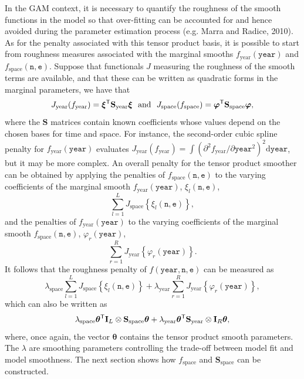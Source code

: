 \documentclass[12pt]{article}
\newcommand{\beq}{\begin{equation}}
\newcommand{\eeq}{\end{equation}}
\newcommand{\ts}{^{\sf T}}
\theoremstyle{definition}
\theoremstyle{plain}
\begin{document}
In the GAM context, it is necessary to quantify the roughness of the smooth functions in the model so that over-fitting can be accounted for and hence avoided during the parameter estimation process (e.g. Marra and Radice, 2010). As for the penalty associated with this tensor product basis, it is possible to start from roughness measures associated with the marginal smooths $f_\text{year}(\texttt{year})$ and $f_\text{space}(\texttt{n},\texttt{e})$. Suppose that functionals $J$ measuring the roughness of the smooth terms are available, and that these can be written as quadratic forms in the marginal parameters, we have that
$$
J_\text{year}(f_\text{year})=\bm\xi\ts\textbf{S}_\text{year}\bm\xi \ \ \text{and} \ \ J_\text{space}(f_\text{space})=\bm\varphi\ts\textbf{S}_\text{space}\bm\varphi,
$$
where the $\textbf{S}$ matrices contain known coefficients whose values depend on the chosen bases for time and space. For instance, the second-order cubic spline penalty for $f_\text{year}(\texttt{year})$ evaluates $J_\text{year}(f_\text{year})=\int\left( \partial^2 f_\text{year}/\partial \texttt{year}^2 \right)^2 \text{d}\texttt{year}$, but it may be more complex. An overall penalty for the tensor product smoother can be obtained by applying the penalties of $f_\text{space}(\texttt{n},\texttt{e})$ to the varying coefficients of the marginal smooth $f_\text{year}(\texttt{year})$, $\xi_l(\texttt{n},\texttt{e})$,
$$
\sum_{l=1}^L J_\text{space}\left\{  \xi_l(\texttt{n},\texttt{e}) \right\},
$$ 
and the penalties of $f_\text{year}(\texttt{year})$ to the varying coefficients of the marginal smooth $f_\text{space}(\texttt{n},\texttt{e})$, $\varphi_r(\texttt{year})$,  
$$
\sum_{r=1}^R J_\text{year}\left\{  \varphi_r(\texttt{year}) \right\}.
$$ 
It follows that the roughness penalty of $f(\texttt{year},\texttt{n},\texttt{e})$ can be measured as 
$$
\lambda_\text{space} \sum_{l=1}^L J_\text{space}\left\{  \xi_l(\texttt{n},\texttt{e}) \right\} + \lambda_\text{year} \sum_{r=1}^R J_\text{year}\left\{  \varphi_r(\texttt{year}) \right\},
$$
which can also be written as
\beq
\lambda_\text{space} \bm\theta\ts \textbf{I}_L \otimes \textbf{S}_\text{space} \bm\theta + \lambda_\text{year} \bm\theta\ts \textbf{S}_\text{year} \otimes \textbf{I}_R  \bm\theta,
\label{TensProd}
\eeq
where, once again, the vector $\bm\theta$ contains the tensor product smooth parameters. The $\lambda$ are smoothing parameters controlling the trade-off between model fit and model smoothness. The next section shows how $f_\text{space}$ and $\textbf{S}_\text{space}$ can be constructed.   
\end{document}
